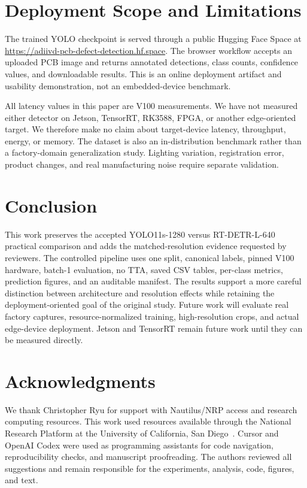 \documentclass[runningheads]{llncs}
\begin{document}
\section{Deployment Scope and Limitations}

The trained YOLO checkpoint is served through a public Hugging Face
Space at
\url{https://adiivd-pcb-defect-detection.hf.space}. The browser
workflow accepts an uploaded PCB image and returns annotated detections,
class counts, confidence values, and downloadable results. This is an
online deployment artifact and usability demonstration, not an
embedded-device benchmark.

All latency values in this paper are V100 measurements. We have not
measured either detector on Jetson, TensorRT, RK3588, FPGA, or another
edge-oriented target. We therefore make no claim about target-device
latency, throughput, energy, or memory. The dataset is also an
in-distribution benchmark rather than a factory-domain generalization
study. Lighting variation, registration error, product changes, and
real manufacturing noise require separate validation.

\section{Conclusion}

This work preserves the accepted YOLO11s-1280 versus RT-DETR-L-640
practical comparison and adds the matched-resolution evidence requested
by reviewers. The controlled pipeline uses one split, canonical labels,
pinned V100 hardware, batch-1 evaluation, no TTA, saved CSV tables,
per-class metrics, prediction figures, and an auditable manifest.
The results support a more careful distinction between architecture
and resolution effects while retaining the deployment-oriented goal of
the original study. Future work will evaluate real factory captures,
resource-normalized training, high-resolution crops, and actual
edge-device deployment. Jetson and TensorRT remain future work until
they can be measured directly.

\section*{Acknowledgments}

We thank Christopher Ryu for support with Nautilus/NRP access and
research computing resources. This work used resources available
through the National Research Platform at the University of California,
San Diego~\cite{weitzel2025nrp}. Cursor and OpenAI Codex were used as
programming assistants for code navigation, reproducibility checks,
and manuscript proofreading. The authors reviewed all suggestions and
remain responsible for the experiments, analysis, code, figures, and
text.



\end{document}
